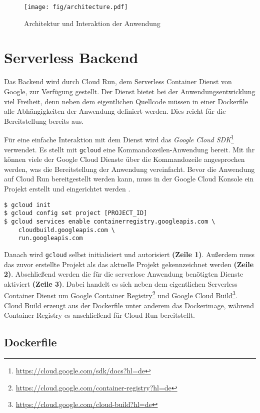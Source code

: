 \begin{figure}
  \centering
  \texttt{[image: fig/architecture.pdf]}
  \caption{Architektur und Interaktion der Anwendung}
  \label{fig:architecture}
\end{figure}

\section{Serverless Backend}
Das Backend wird durch Cloud Run, dem Serverless Container Dienst von Google, zur Verfügung gestellt.
Der Dienst bietet bei der Anwendungsentwicklung viel Freiheit, denn 
neben dem eigentlichen Quellcode müssen in einer Dockerfile alle Abhängigkeiten der Anwendung
definiert werden. Dies reicht für die Bereitstellung bereits aus.

Für eine einfache Interaktion mit dem Dienst wird das
\emph{Google Cloud SDK}\footnote{\url{https://cloud.google.com/sdk/docs?hl=de}} verwendet.
Es stellt mit \texttt{gcloud} eine Kommandozeilen-Anwendung bereit.
Mit ihr können viele der Google Cloud Dienste über die Kommandozeile angesprochen werden,
was die Bereitstellung der Anwendung vereinfacht.
Bevor die Anwendung auf Cloud Run bereitgestellt werden kann, muss in der
Google Cloud Konsole ein Projekt erstellt und eingerichtet werden \cite{CloudRunInstructions}.\\

\begin{lstlisting}[caption={Google Cloud SDK einrichten}, label={lst:gcloud_init}]
$ gcloud init
$ gcloud config set project [PROJECT_ID]
$ gcloud services enable containerregistry.googleapis.com \            
    cloudbuild.googleapis.com \
    run.googleapis.com
\end{lstlisting}

Danach wird \texttt{gcloud} selbst initialisiert und autorisiert \textbf{(Zeile 1)}.
Außerdem muss das zuvor erstellte Projekt als das aktuelle Projekt gekennzeichnet werden \textbf{(Zeile 2)}.
Abschließend werden die für die serverlose Anwendung  benötigten Dienste aktiviert \textbf{(Zeile 3)}.
Dabei handelt es sich neben dem eigentlichen Serverless Container Dienst um
Google Container Registry\footnote{\url{https://cloud.google.com/container-registry?hl=de}}
und Google Cloud Build\footnote{\url{https://cloud.google.com/cloud-build?hl=de}}.
Cloud Build erzeugt aus der Dockerfile unter anderem das Dockerimage, während Container Registry
es anschließend für Cloud Run bereitstellt.

\subsection{Dockerfile}
